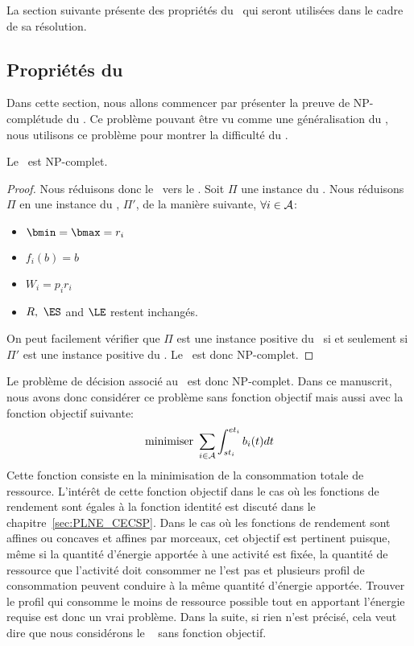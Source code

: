 La section suivante présente des propriétés du \CECSP~qui seront 
utilisées dans le cadre de sa résolution. 

\subsection{Propriétés du \CECSP}
\label{sec:ppte_CECSP}
Dans cette section, nous allons commencer par présenter la preuve de
NP-complétude du \CECSP. Ce problème pouvant être vu comme une
généralisation du \CUSP, nous utilisons ce problème pour montrer la
difficulté du \CECSP. 

\begin{theo}
Le \CECSP~est NP-complet.
\end{theo}

\begin{proof}
Nous réduisons donc le \CUSP~vers le \CECSP. Soit $\Pi$ une instance
du \CUSP. Nous réduisons $\Pi$ en une instance du \CECSP, $\Pi'$, de
la manière suivante, $\forall i \in {\cal A}$:
\begin{itemize}
\item $ \bmin=\bmax=r_i$
\item $f_i(b)=b$
\item $W_i=p_ir_i$
\item $R,\ \ES$ and $\LE$ restent inchangés. 
\end{itemize}

On peut facilement vérifier  que $\Pi$ est une instance positive du \CUSP~si
et seulement si $\Pi'$ est une instance positive du \CECSP. Le
\CECSP~est donc NP-complet.
\end{proof}

Le problème de décision associé au \CECSP~est donc NP-complet. Dans ce
manuscrit, nous avons donc considérer ce problème sans fonction
objectif mais aussi avec la fonction objectif suivante: 
\[\text{minimiser } \sum_{i \in {\cal A}} \int_{st_i}^{et_i} b_i(t)dt\]
Cette fonction consiste en la minimisation de la consommation totale
de ressource. L'intérêt de cette fonction objectif dans le cas où les
fonctions de rendement sont égales à la fonction identité est discuté
dans le chapitre~\ref{sec:PLNE_CECSP}. Dans le cas où les fonctions de
rendement sont affines ou concaves et affines par morceaux, cet
objectif est pertinent puisque, même si la quantité d'énergie apportée
à une activité est fixée, la quantité de ressource que l'activité doit
consommer ne l'est pas et plusieurs profil de consommation peuvent
conduire à la même quantité d'énergie apportée. Trouver le profil qui
consomme le moins de ressource possible tout en apportant l'énergie
requise est donc un vrai problème.  Dans la suite, si rien n'est
précisé, cela veut dire que nous considérons le \CECSP~ sans fonction
objectif.

